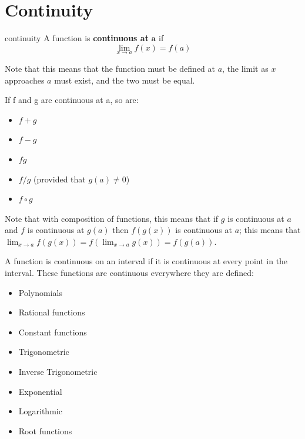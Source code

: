 \documentclass[letterpaper, 11pt, openany]{book}
\theoremstyle{mytheoremstyle}
\theoremstyle{myexamplestyle}
\begin{document}
\section{Continuity}
\setcounter{figure}{0}

\begin{definition}{}{continuity}
    A function is \textbf{continuous at} \(\bm{a}\) if
    \[\lim_{x \to a} f(x) = f(a)\]
\end{definition}
Note that this means that the function must be defined at \(a\), the limit as \(x\) approaches \(a\) must exist, and the two must be equal.

If f and g are continuous at a, so are:
\begin{multicols}{2}
    \begin{itemize}
        \item \(f + g\)
        \item \(f - g\)
        \item \(fg\)
        \item \(f/g\) (provided that \(g(a) \neq 0\))
        \item \(f \circ g\)
    \end{itemize}
\end{multicols}

Note that with composition of functions, this means that if \(g\) is continuous at \(a\) and \(f\) is continuous at \(g(a)\) then \(f(g(x))\) is continuous at \(a\); this means that \(\displaystyle \lim_{x\to a} f(g(x)) = f\left(\lim_{x \to a} g(x) \right) = f(g(a))\).

A function is continuous on an interval if it is continuous at every point in the interval. These functions are continuous everywhere they are defined:
\begin{multicols}{2}
    \begin{itemize}
        \item Polynomials
        \item Rational functions
        \item Constant functions
        \item Trigonometric
        \item Inverse Trigonometric
        \item Exponential
        \item Logarithmic
        \item Root functions
    \end{itemize}
\end{multicols}
\end{document}
